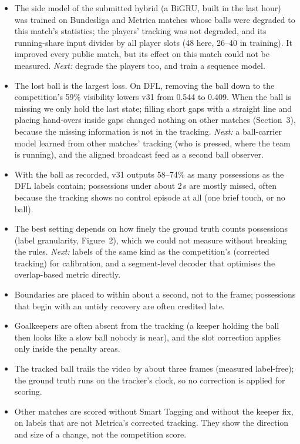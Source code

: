 \documentclass[11pt,a4paper]{article}
\begin{document}
\begin{itemize}
\item The side model of the submitted hybrid (a BiGRU, built in the last hour) was trained on Bundesliga and Metrica matches whose
balls were degraded to this match's statistics; the players' tracking was not degraded, and its running-share
input divides by all player slots (48 here, 26--40 in training). It improved every public match, but its effect
on this match could not be measured. \emph{Next:} degrade the players too, and train a sequence model.
\item The lost ball is the largest loss. On DFL, removing the ball down to the competition's 59\%
visibility lowers v31 from 0.544 to 0.409. When the ball is missing we only hold the last state; filling short gaps with a straight line and placing hand-overs inside gaps changed nothing on other matches (Section~3), because the missing information is not in the tracking.
\emph{Next:} a ball-carrier model learned from other matches' tracking (who is pressed, where the
team is running), and the aligned broadcast feed as a second ball observer.
\item With the ball as recorded, v31 outputs 58--74\% as many possessions as
the DFL labels contain; possessions under about 2\,s are mostly missed, often because the tracking
shows no control episode at all (one brief touch, or no ball).
\item The best setting depends on how finely the ground truth
counts possessions (label granularity, Figure~2), which we could not measure without breaking the rules. \emph{Next:} labels of the
same kind as the competition's (corrected tracking) for calibration, and a segment-level decoder
that optimises the overlap-based metric directly.
\item Boundaries are placed to within about a second, not to the frame; possessions that begin
with an untidy recovery are often credited late.
\item Goalkeepers are often absent from the tracking (a keeper holding the ball then looks like a
slow ball nobody is near), and the slot correction applies only inside the penalty areas.
\item The tracked ball trails the video by about three frames (measured label-free); the
ground truth runs on the tracker's clock, so no correction is applied for scoring.
\item Other matches are scored without Smart Tagging and without the keeper
fix, on labels that are not Metrica's corrected tracking. They show the direction and size of a
change, not the competition score.
\end{itemize}
\end{document}
